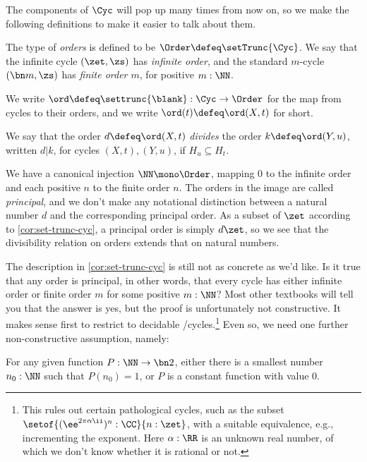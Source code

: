 The components of $\Cyc$ will pop up many times from now on,
so we make the following definitions to make it easier to talk about them.
\begin{definition}\label{def:Order}
  The type of \emph{orders} is defined to be
  $\Order\defeq\setTrunc{\Cyc}$.
  We say that the infinite cycle $(\zet,\zs)$ has \emph{infinite order},
  and the standard $m$-cycle $(\bn m,\zs)$ has \emph{finite order $m$},
  for positive $m:\NN$.

  We write $\ord\defeq\settrunc{\blank}:\Cyc\to\Order$ for the map
  from cycles to their orders, and we write $\ord(t)\defeq\ord(X,t)$ for short.

  We say that the order $d\defeq\ord(X,t)$ \emph{divides} the
  order $k\defeq\ord(Y,u)$, written $d | k$,
  for cycles $(X,t),(Y,u)$, if $H_u \subseteq H_t$.
\end{definition}
We have a canonical injection $\NN \mono \Order$,
mapping $0$ to the infinite order and each positive $n$ to the finite order $n$.
The orders in the image are called \emph{principal},
and we don't make any notational distinction between a natural number $d$
and the corresponding principal order.
As a subset of $\zet$ according to \cref{cor:set-trunc-cyc},
a principal order is simply $d\zet$,
so we see that the divisibility relation on orders extends
that on natural numbers.

The description in \cref{cor:set-trunc-cyc} is still not as concrete as we'd like.
Is it true that any order is principal, in other words,
that every cycle has either infinite order or finite order $m$
for some positive $m:\NN$?
Most other textbooks will tell you that the answer is yes,
but the proof is unfortunately not constructive.
It makes sense first to restrict to decidable \coverings/cycles.\footnote{%
  This rules out certain pathological cycles,
  such as the subset $\setof{(\ee^{2\pi\alpha\ii})^n:\CC}{n:\zet}$,
  with a suitable equivalence, e.g., incrementing the exponent.
  Here $\alpha:\RR$ is an unknown real number,
  of which we don't know whether it is rational or not.}
Even so, we need one further non-constructive assumption, namely:

\begin{principle}
  \label{LPO}%
  For any given function $P:\NN\to\bn 2$,
  either there is a smallest number $n_0:\NN$ such that $P(n_0)=1$,
  or $P$ is a constant function with value $0$.
\end{principle}


